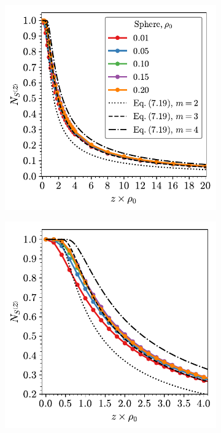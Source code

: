 \begin{figure}

	\begin{subfigure}[b]{0.45\textwidth}
         \centering
         \includegraphics[width=\textwidth]{./figures/quasi2d/n_z_3d_sphere1.pdf}
         \caption{}
         \label{fig:nphia}
     \end{subfigure}
     \hfill
      \begin{subfigure}[b]{0.45\textwidth}
         \centering
         \includegraphics[width=\textwidth]{./figures/quasi2d/n_z_3d_sphere2.pdf}
         \caption{}
         \label{fig:nphib}
     \end{subfigure}
     \hfill
     

\end{figure}
